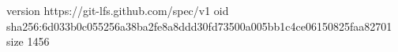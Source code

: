 version https://git-lfs.github.com/spec/v1
oid sha256:6d033b0c055256a38ba2fe8a8ddd30fd73500a005bb1c4ce06150825faa82701
size 1456

